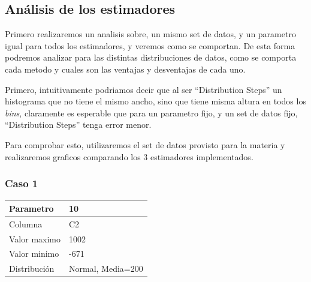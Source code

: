 \documentclass[10pt, a4paper]{article}
\begin{document}
			

	\subsection{An\'alisis de los estimadores}
			

		Primero realizaremos un analisis sobre, un mismo set de datos, y un parametro igual para todos los estimadores, y veremos como se comportan. De esta forma podremos analizar para las distintas distribuciones de datos, como se comporta cada metodo y cuales son las ventajas y desventajas de cada uno.

		Primero, intuitivamente podriamos decir que al ser ``Distribution Steps'' un histograma que no tiene el mismo ancho, sino que tiene misma altura en todos los \textit{bins}, claramente es esperable que para un parametro fijo, y un set de datos fijo, ``Distribution Steps'' tenga error menor.
		
		Para comprobar esto, utilizaremos el set de datos provisto para la materia y realizaremos graficos comparando los 3 estimadores implementados. 
		
		\subsubsection*{Caso 1}
		
		\begin{tabular}{| l | l |}
		\hline
		Parametro & 10 \\
		\hline
		Columna & C2 \\
		\hline
		Valor maximo & 1002 \\
		\hline
		Valor minimo & -671 \\
		\hline
		Distribuci\'on & Normal, Media=200 \\
		\hline
		\end{tabular}
\end{document}
